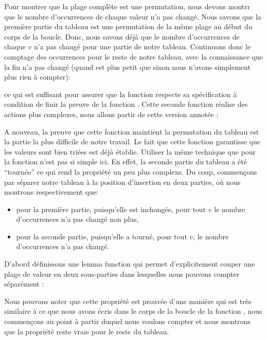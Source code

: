 Pour montrer que la plage complète est une permutation, nous devons montrr que le
nombre d'occurrences de chaque valeur n'a pas changé. Nous savons que la première
partie du tableau est une permutation de la même plage au début du corps de la
boucle. Donc, nous savons déjà que le nombre d'occurrences de chaque $v$ n'a pas
changé pour une partie de notre tableau. Continuons donc le comptage des
occurrences pour le reste de notre tableau, avec la connaissance que la fin n'a
pas changé (quand  est plus petit que  sinon
nous n'avons simplement plus rien à compter):




ce qui est suffisant pour assurer que la fonction 
respecte sa spécification à condition de finir la preuve de la fonction
. Cette seconde fonction réalise des actions plus
complexes, nous allons partir de cette version annotée :




A nouveau, la preuve que cette fonction maintient la permutation du tableau est
la partie la plus difficile de notre travail. Le fait que cette fonction
garantisse que les valeurs sont bien triées est déjà établie. Utiliser la
même technique que pour la fonction  n'est pas si
simple ici. En effet, la seconde partie du tableau a été ``tournée'' ce qui 
rend la propriété un peu plus complexe. Du coup, commençons par séparer notre
tableau à la position d'insertion en deux parties, où nous montrons
respectivement que:


\begin{itemize}
    \item pour la première partie, puisqu'elle est inchangée, pour tout $v$
          le nombre d'occurrences n'a pas changé non plus,
    \item pour la seconde partie, puisqu'elle a tourné, pour tout $v$, le
          nombre d'occurrences n'a pas changé.
\end{itemize}


D'abord définissons une lemma function qui permet d'explicitement couper une
plage de valeur en deux sous-parties dans lesquelles nous pouvons compter
séparément :




Nous pouvons noter que cette propriété est prouvée d'une manière qui est très
similaire à ce que nous avons écris dans le corps de la boucle de la fonction
, nous commençons au point à partir duquel nous
voulons compter et nous montrons que la propriété reste vraie pour le reste
du tableau.


